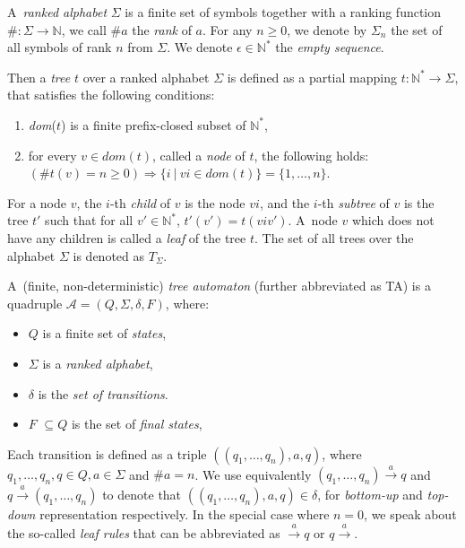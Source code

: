  A~\emph{ranked alphabet} $\Sigma$ is a finite set of symbols together with a
 ranking function $\#: \Sigma \to \mathbb{N}$, we call $\#a$ the \emph{rank}
 of $a$. For any $n \geq 0$, we denote by $\Sigma_n$ the set of all symbols of rank
 $n$ from $\Sigma$. We denote $\epsilon \in \mathbb{N}^*$ the \emph{empty
 sequence}.

Then a \emph{tree} $t$ over a ranked alphabet $\Sigma$ is defined as a partial
mapping $t : \mathbb{N}^* \to \Sigma$, that satisfies the following conditions:
 \begin{enumerate}
  \item \emph{dom}($t$) is a finite prefix-closed subset of $\mathbb{N}^*$,
  \item for every $v \in dom(t)$, called a \emph{node} of $t$, the following
holds: $(\#t(v) = n \geq 0) \Longrightarrow \{i\ |\ vi \in dom(t)\} =
\{1,\ldots,n\}$.
 \end{enumerate}

For a node $v$, the $i$-th \emph{child} of $v$ is the node $vi$, and the $i$-th
\emph{subtree} of $v$ is the tree $t'$ such that for all $v' \in \mathbb{N}^*$, 
$t'(v') = t(viv')$. A~node $v$ which does not have any children is called a
\emph{leaf} of the tree $t$. The set of all trees over the alphabet $\Sigma$ is
denoted as $T_\Sigma$.

A~(finite, non-deterministic) \emph{tree automaton} (further abbreviated as TA)
is a quadruple $\mathcal{A} = (Q, \Sigma, \delta, F)$, where:
 \begin{itemize}
   \item $Q$ is a finite set of \emph{states},
	\item $\Sigma$ is a \emph{ranked alphabet},
	\item $\delta$ is the \emph{set of transitions}.
	\item $F$ $ \subseteq Q$ is the set of \emph{final states},
 \end{itemize}

Each transition is defined as a triple $((q_1,\ldots,q_n), a, q)$, where
$q_1,\ldots,q_n,q \in Q, a \in \Sigma$ and $\#a = n$. We use equivalently
$(q_1,\ldots,q_n) \overset{a}{\longrightarrow} q$ and $q
\overset{a}{\longrightarrow}  (q_1,\ldots,q_n)$ to denote that
$((q_1,\ldots,q_n), a, q) \in \delta$, for \emph{bottom-up} and \emph{top-down}
representation respectively. In the special case where $n = 0$, we speak about
the so-called \emph{leaf rules} that can be abbreviated as
$\overset{a}{\longrightarrow}  q$ or $q \overset{a}{\longrightarrow} $.

